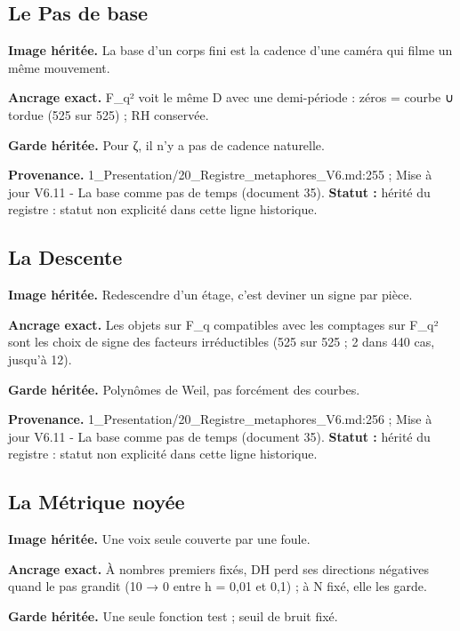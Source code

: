 \documentclass[
  9pt,
  a4paper,
]{article}
\begin{document}
\hypertarget{le-pas-de-base}{%
\subsection{Le Pas de base}\label{le-pas-de-base}}

\textbf{Image héritée.} La base d'un corps fini est la cadence d'une
caméra qui filme un même mouvement.

\textbf{Ancrage exact.} F\_q² voit le même D avec une demi-période :
zéros = courbe ∪ tordue (525 sur 525) ; RH conservée.

\textbf{Garde héritée.} Pour ζ, il n'y a pas de cadence naturelle.

\textbf{Provenance.} 1\_Presentation/20\_Registre\_metaphores\_V6.md:255
; Mise à jour V6.11 - La base comme pas de temps (document 35).
\textbf{Statut :} hérité du registre : statut non explicité dans cette
ligne historique.

\hypertarget{la-descente}{%
\subsection{La Descente}\label{la-descente}}

\textbf{Image héritée.} Redescendre d'un étage, c'est deviner un signe
par pièce.

\textbf{Ancrage exact.} Les objets sur F\_q compatibles avec les
comptages sur F\_q² sont les choix de signe des facteurs irréductibles
(525 sur 525 ; 2 dans 440 cas, jusqu'à 12).

\textbf{Garde héritée.} Polynômes de Weil, pas forcément des courbes.

\textbf{Provenance.} 1\_Presentation/20\_Registre\_metaphores\_V6.md:256
; Mise à jour V6.11 - La base comme pas de temps (document 35).
\textbf{Statut :} hérité du registre : statut non explicité dans cette
ligne historique.

\hypertarget{la-muxe9trique-noyuxe9e}{%
\subsection{La Métrique noyée}\label{la-muxe9trique-noyuxe9e}}

\textbf{Image héritée.} Une voix seule couverte par une foule.

\textbf{Ancrage exact.} À nombres premiers fixés, DH perd ses directions
négatives quand le pas grandit (10 → 0 entre h = 0,01 et 0,1) ; à N
fixé, elle les garde.

\textbf{Garde héritée.} Une seule fonction test ; seuil de bruit fixé.
\end{document}

